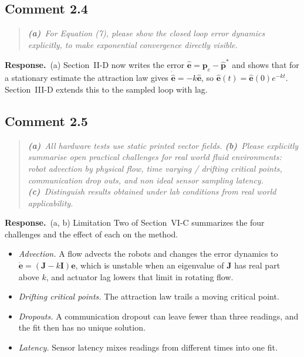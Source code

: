 \documentclass[10pt]{article}
\newcommand{\resp}{\par\textbf{Response.}~}
\begin{document}
\subsection*{Comment 2.4}

\begin{quote}\itshape
\textbf{(a)}~For Equation (7), please show the closed loop error dynamics explicitly, to make exponential convergence directly visible.
\end{quote}


\resp (a) Section~II-D now writes the error $\hat{\mathbf{e}} = \mathbf{p}_c - \hat{\mathbf{p}}^*$ and shows that for a stationary estimate the attraction law gives $\dot{\hat{\mathbf{e}}} = -k\hat{\mathbf{e}}$, so $\hat{\mathbf{e}}(t) = \hat{\mathbf{e}}(0)e^{-kt}$. Section~III-D extends this to the sampled loop with lag.

\subsection*{Comment 2.5}

\begin{quote}\itshape
\textbf{(a)}~All hardware tests use static printed vector fields.
\textbf{(b)}~Please explicitly summarise open practical challenges for real world fluid environments: robot advection by physical flow, time varying / drifting critical points, communication drop outs, and non ideal sensor sampling latency.
\textbf{(c)}~Distinguish results obtained under lab conditions from real world applicability.
\end{quote}


\resp (a, b) Limitation Two of Section~VI-C summarizes the four challenges and the effect of each on the method.
\begin{itemize}
\item \emph{Advection.} A flow advects the robots and changes the error dynamics to $\dot{\mathbf{e}} = (\mathbf{J} - k\mathbf{I})\mathbf{e}$, which is unstable when an eigenvalue of $\mathbf{J}$ has real part above $k$, and actuator lag lowers that limit in rotating flow.
\item \emph{Drifting critical points.} The attraction law trails a moving critical point.
\item \emph{Dropouts.} A communication dropout can leave fewer than three readings, and the fit then has no unique solution.
\item \emph{Latency.} Sensor latency mixes readings from different times into one fit.
\end{itemize}
\end{document}
